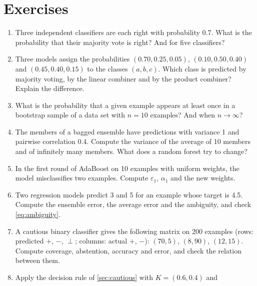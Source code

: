 \section*{Exercises}

\begin{enumerate}[label=\textbf{2.\arabic*},ref=2.\arabic*,leftmargin=*,itemsep=6pt]
  \item\label{exr2:condorcet} Three independent classifiers are each right with probability 0.7.
        What is the probability that their majority vote is right? And for five classifiers?
  \item\label{exr2:fusion} Three models assign the probabilities $(0.70,0.25,0.05)$,
        $(0.10,0.50,0.40)$ and $(0.45,0.40,0.15)$ to the classes $(a,b,c)$. Which class is predicted
        by majority voting, by the linear combiner and by the product combiner? Explain the
        difference.
  \item\label{exr2:bootstrap} What is the probability that a given example appears at least once
        in a bootstrap sample of a data set with $n=10$ examples? And when $n\to\infty$?
  \item\label{exr2:variance} The members of a bagged ensemble have predictions with variance 1 and
        pairwise correlation 0.4. Compute the variance of the average of 10 members and of
        infinitely many members. What does a random forest try to change?
  \item\label{exr2:ada} In the first round of AdaBoost on 10 examples with uniform weights, the
        model misclassifies two examples. Compute $\varepsilon_1$, $\alpha_1$ and the new weights.
  \item\label{exr2:ambiguity} Two regression models predict 3 and 5 for an example whose target is
        4.5. Compute the ensemble error, the average error and the ambiguity, and check
        \cref{eq:ambiguity}.
  \item\label{exr2:cautious} A cautious binary classifier gives the following matrix on 200 examples
        (rows: predicted $+$, $-$, $\perp$; columns: actual $+$, $-$): $(70,5)$, $(8,90)$,
        $(12,15)$. Compute coverage, abstention, accuracy and error, and check the relation between
        them.
  \item\label{exr2:rule} Apply the decision rule of \cref{sec:cautious} with $K=(0.6,0.4)$ and

\end{enumerate}
